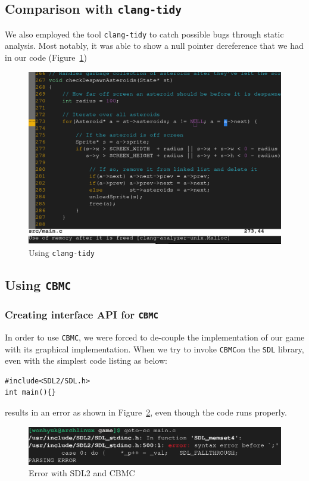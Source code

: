 \documentclass{article}
\newcommand{\cbmc}{\texttt{CBMC}}
\begin{document}
\subsection{Comparison with \texttt{clang-tidy}}
We also employed the tool \texttt{clang-tidy} to catch possible bugs through static analysis.
Most notably, it was able to show a null pointer dereference that we had in our code (Figure~\ref{fig:clang-tidy})
\begin{figure}[h!]
    \includegraphics[width=\linewidth]{clang-tidy.png}
    \caption{Using \texttt{clang-tidy}}
    \label{fig:clang-tidy}
\end{figure}

\subsection{Using \cbmc}
\subsubsection{Creating interface API for \cbmc}
In order to use \cbmc, we were forced to de-couple the implementation of our game with its graphical implementation.
When we try to invoke \cbmc on the \texttt{SDL} library, even with the simplest code listing as below:
\begin{verbatim}
#include<SDL2/SDL.h>
int main(){}
\end{verbatim}
results in an error as shown in Figure~\ref{fig:cbmc-sdl}, even though the code runs properly.

\begin{figure}[h!]
    \includegraphics[width=\linewidth]{cbmc-sdl.png}
    \caption{Error with SDL2 and CBMC}
    \label{fig:cbmc-sdl}
\end{figure}
\end{document}
